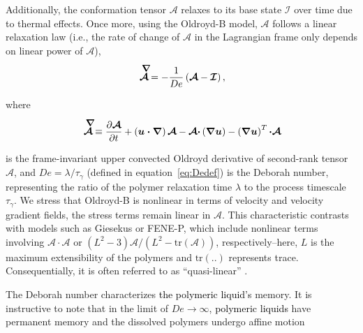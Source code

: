 \documentclass{jfm}
\newcommand{\DL}[1]{{\textcolor{black}{#1}}}
\newcommand{\oo}{\color{magenta} \normalfont}
\newcommand{\bb}{\color{black} \normalfont}
\begin{document}
Additionally, the conformation tensor $ \boldsymbol{\mathcal{A}}$ relaxes to its base state $\boldsymbol{\mathcal{I}}$ over time due to thermal effects.
Once more, using the Oldroyd-B model, $ \boldsymbol{\mathcal{A}}$ follows a linear relaxation law \oo (i.e., the rate of change of $\boldsymbol{\mathcal{A}}$ in the Lagrangian frame only depends on linear power of $\boldsymbol{\mathcal{A}}$),\bb\,

\begin{align}
	\label{Aupperconv}
	\stackrel{\smash{\raisebox{0ex}{$\mkern8mu\boldsymbol{\nabla}$}}}{\boldsymbol{\mathcal{A}}}  =  - \frac{1}{De} \left( \boldsymbol{\mathcal{A}} - \boldsymbol{\mathcal{I}}  \right),
\end{align}

\noindent where

\begin{align}
    \label{Aupper_def}
    \stackrel{\smash{\raisebox{0ex}{$\mkern8mu\boldsymbol{\nabla}$}}}{\boldsymbol{\mathcal{A}}} \equiv \frac{\partial\boldsymbol{\mathcal{A}}}{\partial t} + \left(\boldsymbol{u\cdot\nabla}\right)\boldsymbol{\mathcal{A}} - \boldsymbol{\mathcal{A}\cdot}\left(\boldsymbol{\nabla u}\right) - \left(\boldsymbol{\nabla u}\right)^T\boldsymbol{\cdot\mathcal{A}}
\end{align}

\noindent is the frame-invariant upper convected Oldroyd derivative of second-rank tensor $\boldsymbol{\mathcal{A}}$, and $De = \lambda/\tau_\gamma$ (defined in equation~\eqref{eq:Dedef}) is the Deborah number, representing the ratio of the polymer relaxation time $\lambda$ to the process timescale $\tau_\gamma$. \oo We stress that Oldroyd-B is nonlinear in terms of velocity and 
velocity gradient fields, the stress terms remain linear in $\boldsymbol{\mathcal{A}}$. This characteristic contrasts with models such as Giesekus or FENE-P, 
which include nonlinear terms involving $\boldsymbol{\mathcal{A}\cdot\mathcal{A}}$ or $(L^2-3)\boldsymbol{\mathcal{A}}/(L^2 - \text{tr}(\boldsymbol{\mathcal{A}}))$, respectively--here, $L$ is the maximum extensibility of the polymers and $\text{tr}(..)$ represents trace. 
Consequentially, it is often referred to as ``quasi-linear”  \citep{davoodi2018secondary, alves2021numerical}\bb.

The Deborah number characterizes \DL{the polymeric liquid's} memory.
It is instructive to note that in the limit of $De \to \infty$, \DL{polymeric liquids} have permanent memory and the dissolved polymers undergo affine motion \citep[see equation~\eqref{Aupperconv} and][]{snoeijer2020relationship,stone2023note,boyko2024perspective}
\end{document}
